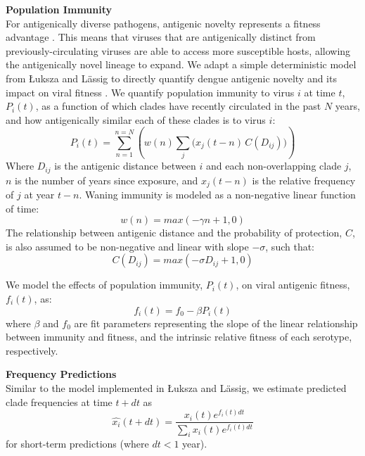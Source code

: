\documentclass[11pt,oneside,letterpaper]{article}
\begin{document}
\textbf{Population Immunity}\\
For antigenically diverse pathogens, antigenic novelty represents a fitness advantage \citep{lipsitch2007patterns}.
This means that viruses that are antigenically distinct from previously-circulating viruses are able to access more susceptible hosts, allowing the antigenically novel lineage to expand.
We adapt a simple deterministic model from {\L}uksza and L\"assig to directly quantify dengue antigenic novelty and its impact on viral fitness \citep{luksza2014predictive}.
We quantify population immunity to virus $i$ at time $t$, $P_i(t)$, as a function of which clades have recently circulated in the past $N$ years, and how antigenically similar each of these clades is to virus $i$:
\begin{equation}
  \label{eq_population_immunity}
P_i(t) = \sum_{n=1}^{n=N} \left(w(n)  \sum_{j} \Big( x_j(t-n) \, C( D_{ij}) \Big) \right)
\end{equation}
Where $D_{ij}$ is the antigenic distance between $i$ and each non-overlapping clade $j$, $n$ is the number of years since exposure, and $x_j(t-n)$ is the relative frequency of $j$ at year $t-n$.
Waning immunity is modeled as a non-negative linear function of time:
\begin{equation}
\label{eq_waning_immunity}
  w(n) = max(-\gamma n + 1, 0)
\end{equation}
The relationship between antigenic distance and the probability of protection, $C$, is also assumed to be non-negative and linear with slope $-\sigma$, such that:
\begin{equation}
C(D_{ij}) = max(-\sigma D_{ij} + 1, 0)
\end{equation}

We model the effects of population immunity, $P_i(t)$, on viral antigenic fitness, $f_i(t)$, as:
\begin{equation}
  \label{eq_fitness}
f_i(t) = f_0-\beta P_i(t)
\end{equation}
where $\beta$ and $f_0$ are fit parameters representing the slope of the linear relationship between immunity and fitness, and the intrinsic relative fitness of each serotype, respectively.

\textbf{Frequency Predictions}\\
Similar to the model implemented in {\L}uksza and L\"assig, we estimate predicted clade frequencies at time $t + dt$ as
\begin{equation}
  \label{eq_predict_frequency}
\hat{x_i}(t+dt) = \frac{x_i(t) e^{f_i(t) dt}}{\sum_{i}x_i(t) e^{f_i(t) dt}}
\end{equation}
for short-term predictions (where $dt < 1$ year).
\end{document}
